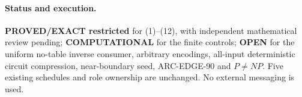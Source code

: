 \documentclass[11pt]{article}
\begin{document}
\paragraph{Status and execution.} \textbf{PROVED/EXACT restricted} for
(1)--(12), with independent mathematical review pending;
\textbf{COMPUTATIONAL} for the finite controls; \textbf{OPEN}
for the uniform no-table inverse consumer, arbitrary encodings,
all-input deterministic circuit compression, near-boundary seed,
ARC-EDGE-90 and $P\ne NP$. Five existing schedules and role ownership
are unchanged. No external messaging is used.



\end{document}
